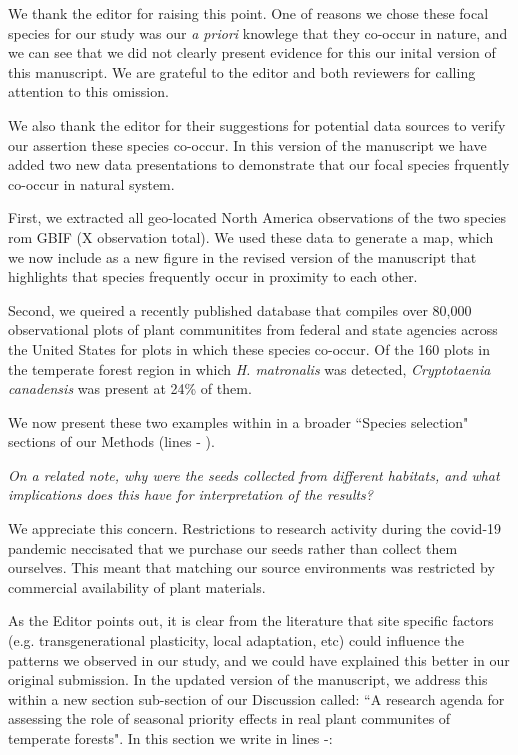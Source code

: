 \documentclass[11pt]{article}
\begin{document}
We thank the editor for raising this point. One of reasons we chose these focal species for our study was our \emph{a priori} knowlege that they co-occur in nature, and we can see that we did not clearly present evidence for this our inital version of this manuscript. We are grateful to the editor and both reviewers for calling attention to this omission.

We also thank the editor for their suggestions for potential data sources to verify our assertion these species co-occur. In this version of the manuscript we have added two new data presentations to demonstrate that our focal species frquently co-occur in natural system. 

First, we extracted all geo-located North America observations of the two species rom GBIF (X observation total). We used these data to generate a map, which we now include as a new figure in the revised version of the manuscript that highlights that species frequently occur in proximity to each other.

Second, we queired a recently published database that compiles over 80,000 observational plots of plant communitites from federal and state agencies across the United States for plots in which these species co-occur. Of the 160 plots in the temperate forest region in which \emph{H. matronalis} was detected, \emph{Cryptotaenia canadensis} was present at 24\% of them. 

We now present these two examples within in a broader ``Species selection" sections of our Methods (lines - ).


\emph{On a related note, why were the seeds collected from different habitats, and what implications does this have for interpretation of the results?}

We appreciate this concern. Restrictions to research activity during the covid-19 pandemic neccisated that we purchase our seeds rather than collect them ourselves. This meant that matching our source environments was restricted by commercial availability of plant materials. 

As the Editor points out, it is clear from the literature that site specific factors (e.g.  transgenerational plasticity, local adaptation, etc) could influence the patterns we observed in our study, and we could have explained this better in our original submission. In the updated version of the manuscript, we address this within a new section sub-section of our Discussion called: ``A research agenda for assessing the role of seasonal priority effects in real plant communites of temperate forests". In this section we write in lines -:
\end{document}

